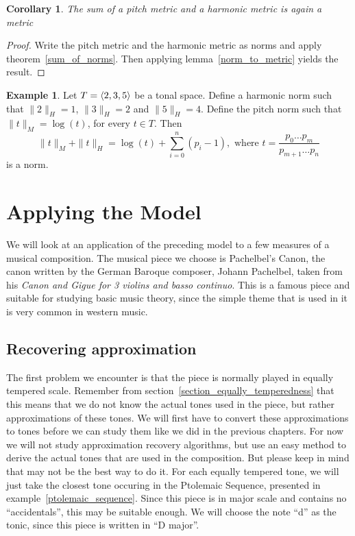 \documentclass[a4paper]{book}
\newtheorem{corollary}[theorem]{Corollary}
\theoremstyle{definition}
\newtheorem{example}[theorem]{Example}
\begin{document}
\begin{corollary}
    The sum of a pitch metric and a harmonic metric is again a metric
    \label{sum_of_metrics}
\end{corollary}
\begin{proof}
    Write the pitch metric and the harmonic metric as norms and apply theorem~\ref{sum_of_norms}.
    Then applying lemma~\ref{norm_to_metric} yields the result.
\end{proof}

\begin{example}
    Let $T = \langle 2,3,5 \rangle$ be a tonal space.
    Define a harmonic norm such that $\|2\|_H = 1$, $\|3\|_H = 2$ and $\|5\|_H = 4$.
    Define the pitch norm such that $\|t\|_M = \log(t)$, for every $t\in T$.
    Then \[\|t\|_M + \|t\|_H = \log(t) +\sum_{i = 0}^{n}{(p_i-1)},\text{\ where\ } t = \frac{p_0 \dots p_m}{p_{m+1} \dots p_n} \] is a norm.
\end{example}

\chapter{Applying the Model}
\label{application}
We will look at an application of the preceding model to a few measures of a musical composition.
The musical piece we choose is Pachelbel's Canon, the canon written by the German Baroque composer, Johann Pachelbel, taken from his \emph{Canon and Gigue for 3 violins and basso continuo}.
This is a famous piece and suitable for studying basic music theory, since the simple theme that is used in it is very common in western music.

\section{Recovering approximation}
The first problem we encounter is that the piece is normally played in equally tempered scale.
Remember from section~\ref{section_equally_temperedness} that this means that we do not know the actual tones used in the piece, but rather approximations of these tones.
We will first have to convert these approximations to tones before we can study them like we did in the previous chapters.
For now we will not study approximation recovery algorithms, but use an easy method to derive the actual tones that are used in the composition.
But please keep in mind that may not be the best way to do it.
For each equally tempered tone, we will just take the closest tone occuring in the Ptolemaic Sequence, presented in example~\ref{ptolemaic_sequence}.
Since this piece is in major scale and contains no ``accidentals'', this may be suitable enough.
We will choose the note ``d'' as the tonic, since this piece is written in ``D major''.
\end{document}
